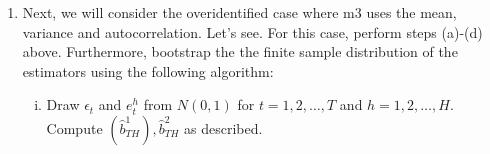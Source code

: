 \documentclass{article} %
\theoremstyle{definition}
\newenvironment{solution}[1][Answer]{\begin{singlespace}\underline{\textbf{#1:}}\quad }{\ \rule{0.3em}{0.3em}\end{singlespace}} %
\begin{document}
\begin{enumerate}
\begin{solution}
\begin{enumerate}[label=(\alph*)]
\begin{equation*}
\begin{bmatrix}
											\end{bmatrix}
				\end{equation*}
				The variance-covariance matrix of $\hat{b}^{2}_{TH}$ is given by
				\begin{equation*}
											\begin{bmatrix}
											7.43e-5 & -1.02e-3 \\
											-1.02e-3 & 0.01
											\end{bmatrix}
				\end{equation*}
				The standard errors are given by
				\begin{equation*}
											\begin{bmatrix}
											0.01 \\
											0.12
											\end{bmatrix}
				\end{equation*}
				For local identification, it is useful to have the elements of $\nabla_{b} g_{T}(\hat{b}^{2}_{TH})$ to be relatively large. This is because if the distance between the modeled moments and the data moments is changing rapidly around the optimal parameter choices, we can be more confident in the precision with which we've identified the local optimal parameter values.
			\item The $J$-test value is $2.29e-7$.
		\end{enumerate}
		\end{solution}
		
		\item Next, we will consider the overidentified case where m3 uses the mean, variance and autocorrelation. Let’s see. For this case, perform steps (a)-(d) above. Furthermore, bootstrap the the finite sample distribution of the estimators using the following algorithm:
		\begin{enumerate}[i.]
			\item Draw $ \epsilon_t $ and $ e_t^h $ from $ N(0,1) $ for $ t = 1,2,\hdots,T $ and $ h = 1,2,\hdots,H $. Compute $ (\hat{b}_{TH}^1), \hat{b}_{TH}^2 $ as described.
			

\end{enumerate}
\end{enumerate}
\end{document}
